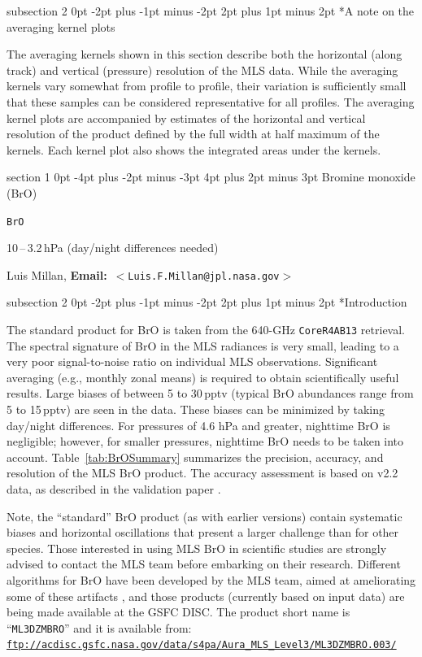 \documentclass[11pt,draft]{report}
\makeatletter
\renewcommand{\section}{\@startsection%
  {section}%
  {1}%
  {0pt}%
  {-4pt plus -2pt minus -3pt}%
  {4pt plus 2pt minus 3pt}%
  {\Large\sffamily\fontseries{sb}\selectfont\flushleft\color{SectionColor}\figureversion{tabular}}}%
\renewcommand{\subsection}{\@startsection%
  {subsection}%
  {2}%
  {0pt}%
  {-2pt plus -1pt minus -2pt}%
  {2pt plus 1pt minus 2pt}%
  {\large\sffamily\fontseries{sb}\selectfont\flushleft\color{SectionColor}\figureversion{tabular}}}%
\newcommand{\speciestitle}[5][]{%
\cleardoublepage
\suppressfloats[t]%
\thispagestyle{plain}%
{\noindent\colorbox{SectionBackground}{%
\begin{minipage}{\linewidth-2\fboxsep}%
\flushleft%
\section{#2 (#3)}%
\rhead{\large\sffamily\color{HeaderFooterColor}\nouppercase{\thesection.\
  #2 (#3)}}
\label{navSection#4}%
\label{sec:Standard#4}%
\color{SectionColor}\sffamily
\begin{description}[font=\sffamily\bfseries,topsep=0pt,partopsep=0pt]
\item[Swath name:] \texttt{#4} #1
#5
\end{description}
\end{minipage}}}%
\renewcommand{\currentnav}{#4}%
}
\newcommand{\email}[1]{\mbox{\textbf{Email:} $<$\texttt{#1}$>$}}
\newcommand{\currentnav}{BLANK}
\makeatother
\begin{document}
\subsection*{A note on the averaging kernel plots}

The averaging kernels shown in this section describe both the horizontal
(along track) and vertical (pressure) resolution of the MLS \thisv data.
While the averaging kernels vary somewhat from profile to profile, their
variation is sufficiently small that these samples can be considered
representative for all profiles.  The averaging kernel plots are
accompanied by estimates of the horizontal and vertical resolution of
the product defined by the full width at half maximum of the kernels.
Each kernel plot also shows the integrated areas under the kernels.

\speciestitle{Bromine monoxide}{BrO}{BrO}{%
\item[Useful range: ] 10\,--\,3.2\,hPa (day/night differences needed)
\item[Contact:] Luis Millan, \email{Luis.F.Millan@jpl.nasa.gov}}
\subsection*{Introduction}

The standard product for BrO is taken from the 640-GHz \texttt{CoreR4AB13}
retrieval. The spectral signature of BrO in the MLS radiances is very
small, leading to a very poor signal-to-noise ratio on individual MLS
observations.  Significant averaging (e.g., monthly zonal means) is
required to obtain scientifically useful results.  Large biases of
between 5 to 30\,pptv (typical BrO abundances range from 5 to 15\,pptv)
are seen in the data. These biases can be minimized by taking day/night
differences. For pressures of 4.6 hPa and greater, nighttime BrO is
negligible; however, for smaller pressures, nighttime BrO needs to be
taken into account. Table~\ref{tab:BrOSummary} summarizes the precision,
accuracy, and resolution of the MLS \thisv BrO product. The accuracy
assessment is based on v2.2 data, as described in the validation paper
\citep{KovalenkoEtal07}.

Note, the \thisv ``standard'' BrO product (as with earlier versions)
contain systematic biases and horizontal oscillations that present a
larger challenge than for other species.  Those interested in using MLS
BrO in scientific studies are strongly advised to contact the MLS team
before embarking on their research.  Different algorithms for BrO have
been developed by the MLS team, aimed at ameliorating some of these
artifacts \citep{MillanEtal12}, and those products (currently based on
\prevv input data) are being made available at the GSFC DISC\@.  The
product short name is ``\texttt{ML3DZMBRO}'' and it is available from:
\newcommand{\myus}{\rule{1ex}{0.8pt}}
\href{ftp://acdisc.gsfc.nasa.gov/data/s4pa/Aura_MLS_Level3/ML3DZMBRO.003/}%
{\texttt{ftp://acdisc.gsfc.nasa.gov/data/s4pa/Aura\_MLS\_Level3/ML3DZMBRO.003/}}
\end{document}
